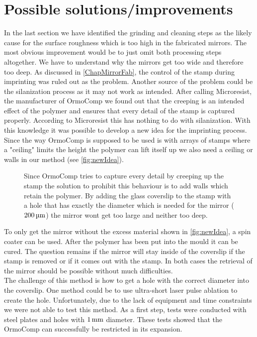 \section{Possible solutions/improvements}\label{ChapSolutions}
In the last section we have identified the grinding and cleaning steps as the likely cause for the surface roughness which is too high in the fabricated mirrors. The most obvious improvement would be to just omit both processing steps altogether. We have to understand why the mirrors get too wide and therefore too deep. As discussed in \autoref{ChapMirrorFab}, the control of the stamp during imprinting was ruled out as the problem. Another source of the problem could be the silanization process as it may not work as intended. After calling Microresist, the manufacturer of OrmoComp we found out that the creeping is an intended effect of the polymer and ensures that every detail of the stamp is captured properly. According to Microresist this has nothing to do with silanization.
With this knowledge it was possible to develop a new idea for the imprinting process. Since the way OrmoComp is supposed to be used is with arrays of stamps where a "ceiling" limits the height the polymer can lift itself up we also need a ceiling or walls in our method (see \autoref{fig:newIdea}).

\begin{figure}[H]
	
	\caption{Since OrmoComp tries to capture every detail by creeping up the stamp the solution to prohibit this behaviour is to add walls which retain the polymer. By adding the glass coverslip to the stamp with a hole that has exactly the diameter which is needed for the mirror ($200\um$) the mirror wont get too large and neither too deep.}
	\label{fig:newIdea}
\end{figure}

To only get the mirror without the excess material shown in \autoref{fig:newIdea}, a spin coater can be used. After the polymer has been put into the mould it can be cured. The question remains if the mirror will stay inside of the coverslip if the stamp is removed or if it comes out with the stamp. In both cases the retrieval of the mirror should be possible without much difficulties.\\
The challenge of this method is how to get a hole with the correct diameter into the coverslip. One method could be to use ultra-short laser pulse ablation to create the hole.  Unfortunately, due to the lack of equipment and time constraints we were not able to test this method. As a first step, tests were conducted with steel plates and holes with $1\mm$ diameter. These tests showed that the OrmoComp can successfully be restricted in its expansion.